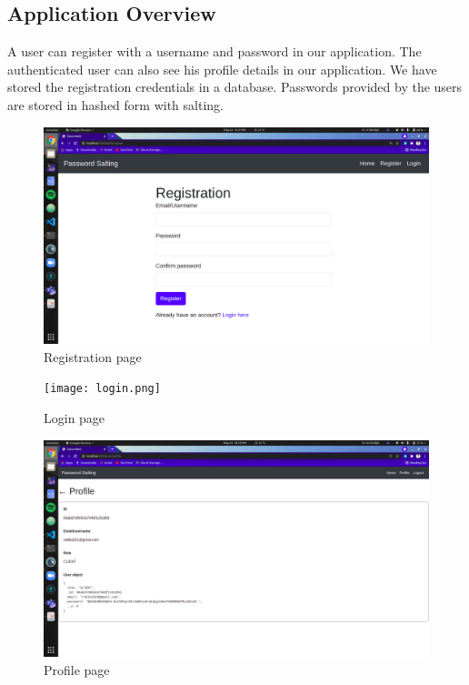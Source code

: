 \documentclass{article}[12pt,a4paper]
\begin{document}
\subsection{Application Overview}
A user can register with a username and password in our application. The authenticated user can also see his profile details in our application. We have stored the registration credentials in a database. Passwords provided by the users are stored in hashed form with salting. 
\begin{figure}[hbt!]
        \centering
        \includegraphics[scale=0.2]{regstn.png}
        \caption{Registration page}
\end{figure}
\newpage
\begin{figure}[hbt!]
        \centering
        \texttt{[image: login.png]}
        \caption{Login page}
\end{figure}
\begin{figure}[hbt!]
        \centering
        \includegraphics[scale=0.2]{profile.png}
        \caption{Profile page}
\end{figure}
\newpage
\end{document}
